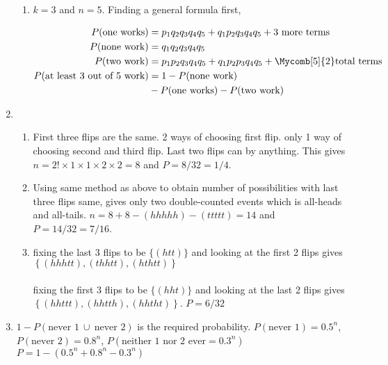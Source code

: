 \begin{enumerate}
\begin{enumerate}
		
		\item $ k = 3 $ and $ n = 5 $. Finding a general formula first, 
		
		
			\begin{align}
				P(\text{one works}) &= p_1 q_2 q_3 q_4 q_5 + q_1 p_2 q_3 q_4 q_5 + \text{3 more terms} \\
				P(\text{none work}) &= q_1 q_2 q_3 q_4 q_5\\
				P(\text{two work}) &= p_1 p_2 q_3 q_4 q_5 + q_1 p_2 p_3 q_4 q_5 + \Mycomb[5]{2}\text{total terms} \\
				P(\text{at least 3 out of 5 work}) &= 1 - P(\text{none work}) \nonumber \\
				&- P(\text{one works}) - P(\text{two work})
			\end{align}
		
	\end{enumerate}
	
	\item \begin{enumerate}
		\item First three flips are the same. 2 ways of choosing first flip. only 1 way of choosing second and third flip. Last two flips can by anything.
		This gives $ n = 2! \times 1 \times 1 \times 2 \times 2  = 8$ and $ P = 8/32 = 1/4 $.
		
		\item Using same method as above to obtain number of possibilities with last three flips same, gives only two double-counted events which is all-heads and all-tails.
		$ n = 8 + 8 - (hhhhh) - (ttttt)  = 14$ and $ P = 14/32 = 7/16 $.
		
		\item fixing the last 3 flips to be $ \{ (htt) \} $ and looking at the first 2 flips gives
		$ \left\{ (hhhtt), (thhtt), (hthtt) \right\} $ \\\\
		fixing the first 3 flips to be $ \{ (hht) \} $ and looking at the last 2 flips gives
		$ \left\{ (hhttt), (hhtth), (hhtht) \right\} $.
		$ P = 6/32 $\\
	\end{enumerate}
	
	\item $ 1 - P( \text{never 1}\  \cup\  \text{never 2}) $ is the required probability.
	$ P(\text{never 1}) = 0.5^n $, $ P(\text{never 2}) = 0.8^n $, $P(\text{neither 1 nor 2 ever} = 0.3^n)$ \\
	$ P = 1 - (0.5^n + 0.8^n - 0.3^n) $\\
	

\end{enumerate}
